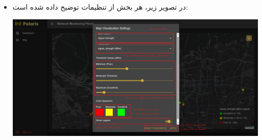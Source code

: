\begin{itemize}
    \item در تصویر زیر، هر بخش از تنظیمات توضیح داده شده است:
    \begin{center}
        \includegraphics[width=\textwidth]{images/settings_overall_explained.png}
    \end{center}


\end{itemize}
